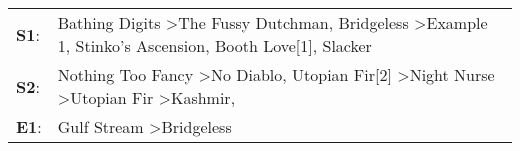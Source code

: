 \begin{supertabular}{p{0.03\textwidth}p{0.92\textwidth}}
 \textbf{S1}:  &          Bathing Digits\textsuperscript{} \textgreater \enspace The Fussy Dutchman\textsuperscript{}, \enspace Bridgeless\textsuperscript{} \textgreater \enspace Example 1\textsuperscript{}, \enspace Stinko's Ascension\textsuperscript{}, \enspace Booth Love[1]\textsuperscript{}, \enspace Slacker\textsuperscript{}  \enspace  \\
 \textbf{S2}:  &  Nothing Too Fancy\textsuperscript{} \textgreater \enspace No Diablo\textsuperscript{}, \enspace Utopian Fir[2]\textsuperscript{} \textgreater \enspace Night Nurse\textsuperscript{} \textgreater \enspace Utopian Fir\textsuperscript{} \textgreater \enspace Kashmir\textsuperscript{}, \textsuperscript{}  \enspace  \\
 \textbf{E1}:  &                                                                                                                                                                                                                                           Gulf Stream\textsuperscript{} \textgreater \enspace Bridgeless\textsuperscript{}  \enspace  \\
\end{supertabular}
